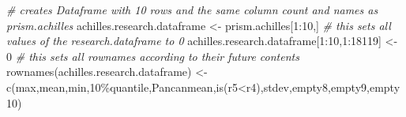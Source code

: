 \documentclass[
]{article}
\newenvironment{Shaded}{\begin{snugshade}}{\end{snugshade}}
\newcommand{\CommentTok}[1]{\textcolor[rgb]{0.56,0.35,0.01}{\textit{#1}}}
\newcommand{\DecValTok}[1]{\textcolor[rgb]{0.00,0.00,0.81}{#1}}
\newcommand{\FunctionTok}[1]{\textcolor[rgb]{0.00,0.00,0.00}{#1}}
\newcommand{\NormalTok}[1]{#1}
\newcommand{\OtherTok}[1]{\textcolor[rgb]{0.56,0.35,0.01}{#1}}
\newcommand{\SpecialCharTok}[1]{\textcolor[rgb]{0.00,0.00,0.00}{#1}}
\newcommand{\StringTok}[1]{\textcolor[rgb]{0.31,0.60,0.02}{#1}}
\begin{document}
\begin{Shaded}
\begin{Highlighting}[]
\CommentTok{\# creates Dataframe with 10 rows and the same column count and names as prism.achilles}
\NormalTok{achilles.research.dataframe }\OtherTok{\textless{}{-}}\NormalTok{ prism.achilles[}\DecValTok{1}\SpecialCharTok{:}\DecValTok{10}\NormalTok{,]}
\CommentTok{\# this sets all values of the research.dataframe to 0}
\NormalTok{achilles.research.dataframe[}\DecValTok{1}\SpecialCharTok{:}\DecValTok{10}\NormalTok{,}\DecValTok{1}\SpecialCharTok{:}\DecValTok{18119}\NormalTok{] }\OtherTok{\textless{}{-}} \DecValTok{0}
\CommentTok{\# this sets all rownames according to their future contents}
\FunctionTok{rownames}\NormalTok{(achilles.research.dataframe) }\OtherTok{\textless{}{-}} \FunctionTok{c}\NormalTok{(}\StringTok{\textquotesingle{}max\textquotesingle{}}\NormalTok{,}\StringTok{\textquotesingle{}mean\textquotesingle{}}\NormalTok{,}\StringTok{\textquotesingle{}min\textquotesingle{}}\NormalTok{,}\StringTok{\textquotesingle{}10\%quantile\textquotesingle{}}\NormalTok{,}\StringTok{\textquotesingle{}Pancanmean\textquotesingle{}}\NormalTok{,}\StringTok{\textquotesingle{}is(r5\textless{}r4)\textquotesingle{}}\NormalTok{,}\StringTok{\textquotesingle{}stdev\textquotesingle{}}\NormalTok{,}\StringTok{\textquotesingle{}empty8\textquotesingle{}}\NormalTok{,}\StringTok{\textquotesingle{}empty9\textquotesingle{}}\NormalTok{,}\StringTok{\textquotesingle{}empty10\textquotesingle{}}\NormalTok{)}


\end{Highlighting}
\end{Shaded}
\end{document}
